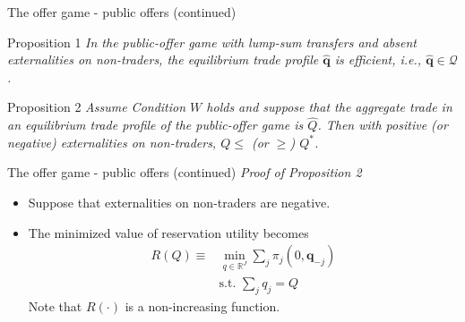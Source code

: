 \documentclass[aspectratio=169]{beamer}  %
\begin{document}
\begin{frame}{The offer game - public offers (continued)}
    \begin{block}{Proposition 1}
        \textit{In the public-offer game with lump-sum transfers and absent externalities on non-traders, the equilibrium trade profile $\hat{\mathbf{q}}$ is efficient, i.e., $\hat{\mathbf{q}}\in \mathcal{Q}$.}
    \end{block}\vspace{.2cm}
    \begin{block}{Proposition 2}
        \textit{Assume Condition $W$ holds and suppose that the aggregate trade
        in an equilibrium trade profile of the public-offer game is $\hat{Q}$. Then with positive (or negative) externalities on non-traders, $Q\leq$ (or $\geq$) $Q^*$.}
    \end{block}
\end{frame}



\begin{frame}{The offer game - public offers (continued)}
    \textit{Proof of Proposition 2} \vspace{.2cm}
    \begin{itemize}
        \item Suppose that externalities on non-traders are negative. \vspace{.2cm}
        \item The minimized value of reservation utility becomes \vspace{.2cm}
        \begin{equation*}
            \begin{aligned}
                R(Q) \equiv & \min_{q \in \mathbb{R}^J} \sum_j \pi_j(0, \mathbf{q}_{-j}) \\
                & \text{s.t. } \sum_j q_j = Q
            \end{aligned}
        \end{equation*}
        Note that $R(\cdot)$ is a non-increasing function. \vspace{.2cm}
    \end{itemize}
\end{frame}
\end{document}
